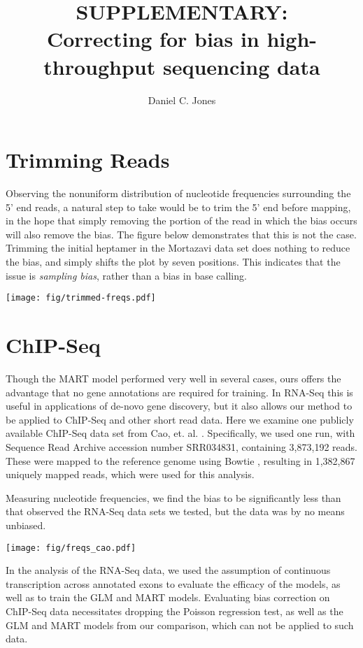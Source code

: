 \documentclass[letterpaper]{article}
\title{SUPPLEMENTARY:\\Correcting for bias in high-throughput sequencing data}
\author{Daniel C. Jones}
\begin{document}


\section{Trimming Reads}

Observing the nonuniform distribution of nucleotide frequencies surrounding the
5' end reads, a natural step to take would be to trim the 5' end before mapping,
in the hope that simply removing the portion of the read in which the bias
occurs will also remove the bias. The figure below demonstrates that this is not
the case. Trimming the initial heptamer in the Mortazavi data set does nothing to
reduce the bias, and simply shifts the plot by seven positions. This indicates
that the issue is \emph{sampling bias}, rather than a bias in base calling.


\begin{center}
\texttt{[image: fig/trimmed-freqs.pdf]}
\end{center}


\section{ChIP-Seq}

Though the MART model \cite{Li2010} performed very well in several cases, ours
offers the advantage that no gene annotations are required for training.  In
RNA-Seq this is useful in applications of de-novo gene discovery, but it also
allows our method to be applied to ChIP-Seq and other short read data. Here we
examine one publicly available ChIP-Seq data set from Cao, et. al.
\cite{Cao2010}. Specifically, we used one run, with Sequence Read Archive
accession number SRR034831, containing 3,873,192 reads. These were mapped to the
reference genome using Bowtie \cite{Langmead2009}, resulting in 1,382,867
uniquely mapped reads, which were used for this analysis.

Measuring nucleotide frequencies, we find the bias to be significantly less
than that observed the RNA-Seq data sets we tested, but the data was by no means
unbiased.

\begin{center}
\texttt{[image: fig/freqs\_cao.pdf]}
\end{center}

In the analysis of the RNA-Seq data, we used the assumption of continuous
transcription across annotated exons to evaluate the efficacy of the models, as
well as to train the GLM and MART models. Evaluating bias correction on ChIP-Seq
data necessitates dropping the Poisson regression test, as well as the GLM and
MART models from our comparison, which can not be applied to such data.
\end{document}
